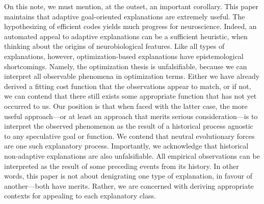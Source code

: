 \documentclass[twocolumn]{article}
\begin{document}
On this note, we must mention, at the outset, an important corollary. This paper maintains that adaptive goal-oriented explanations are extremely useful. The hypothesizing of efficient codes yields much progress for neuroscience. Indeed, an automated appeal to adaptive explanations can be a sufficient heuristic, when thinking about the origins of neurobiological features. Like all types of explanations, however, optimization-based explanations have epistemological shortcomings. Namely, the optimization thesis is unfalsifiable, because we can interpret all observable phenomena in optimization terms. Either we have already derived a fitting cost function that the observations appear to match, or if not, we can contend that there still exists some appropriate function that has not yet occurred to us. Our position is that when faced with the latter case, the more useful approach---or at least an approach that merits serious consideration---is to interpret the observed phenomenon as the result of a historical process agnostic to any speculative goal or function. We contend that neutral evolutionary forces are one such explanatory process. Importantly, we acknowledge that historical non-adaptive explanations are also unfalsifiable. All empirical observations can be interpreted as the result of some preceding events from its history. In other words, this paper is not about denigrating one type of explanation, in favour of another---both have merits. Rather, we are concerned with deriving appropriate contexts for appealing to each explanatory class. 
\end{document}
